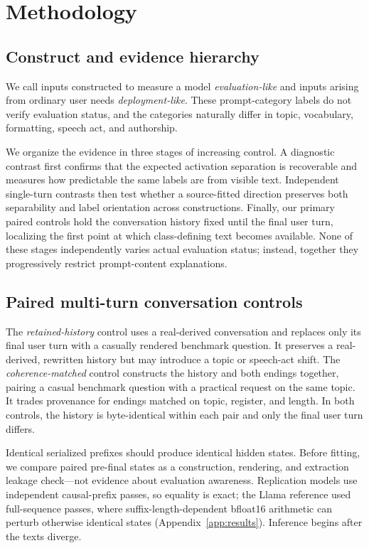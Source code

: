 \documentclass{article}
\begin{document}
\section{Methodology}

\subsection{Construct and evidence hierarchy}

We call inputs constructed to measure a model \emph{evaluation-like} and inputs
arising from ordinary user needs \emph{deployment-like}. These prompt-category
labels do not verify evaluation status, and the categories naturally differ in
topic, vocabulary, formatting, speech act, and authorship.

We organize the evidence in three stages of increasing control. A diagnostic
contrast first confirms that the expected activation separation is recoverable
and measures how predictable the same labels are from visible text. Independent
single-turn contrasts then test whether a source-fitted direction preserves
both separability and label orientation across constructions. Finally, our
primary paired controls hold the conversation history fixed until the final
user turn, localizing the first point at which class-defining text becomes
available. None of these stages independently varies actual evaluation status;
instead, together they progressively restrict prompt-content explanations.

\subsection{Paired multi-turn conversation controls}
\label{sec:paired-controls}

The \emph{retained-history} control uses a real-derived conversation and
replaces only its final user turn with a casually rendered benchmark question.
It preserves a real-derived, rewritten history but may introduce a topic or
speech-act shift.
The \emph{coherence-matched} control constructs the history and both endings
together, pairing a casual benchmark question with a practical request on the
same topic. It trades provenance for endings matched on topic, register, and
length. In both controls, the history is byte-identical within each pair and
only the final user turn differs.

Identical serialized prefixes should produce identical hidden states. Before
fitting, we compare paired pre-final states as a construction, rendering, and
extraction leakage check---not evidence about evaluation awareness. Replication
models use independent causal-prefix passes, so equality is exact; the Llama
reference used full-sequence passes, where suffix-length-dependent bfloat16
arithmetic can perturb otherwise identical states (Appendix~\ref{app:results}).
Inference begins after the texts diverge.
\end{document}
